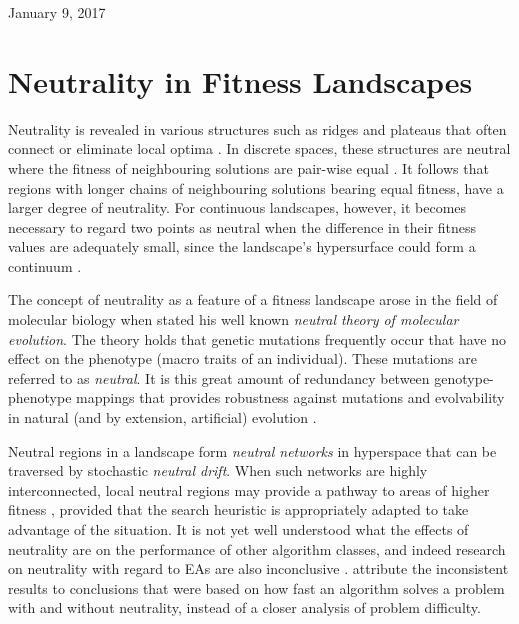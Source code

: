 \documentclass[conference]{IEEEtran}
\begin{document}
\hfill January 9, 2017

\section{Neutrality in Fitness Landscapes}
\label{backgroundNeutralityFL}
Neutrality is revealed in various structures such as ridges and plateaus that often connect or eliminate local optima \cite{owen2007adapting}. In discrete spaces, these structures are neutral where the fitness of neighbouring solutions are pair-wise equal \cite{reidys2001neutrality}. It follows that regions with longer chains of neighbouring solutions bearing equal fitness, have a larger degree of neutrality. For continuous landscapes, however, it becomes necessary to regard two points as neutral when the difference in their fitness values are adequately small, since the landscape's hypersurface could form a continuum \cite{izquierdo2004evolving}.

The concept of neutrality as a feature of a fitness landscape arose in the field of molecular biology when \citet{kimura1984neutral} stated his well known \textit{neutral theory of molecular evolution}. The theory holds that genetic mutations frequently occur that have no effect on the phenotype (macro traits of an individual). These mutations are referred to as \textit{neutral}. It is this great amount of redundancy between genotype-phenotype mappings that provides robustness against mutations \cite{wilke2001evolution,wagner2005robustness} and evolvability \cite{wagner2005robustness} in natural (and by extension, artificial) evolution \cite{huynen1996smoothness}. 

Neutral regions in a landscape form \textit{neutral networks} in hyperspace that can be traversed by stochastic \textit{neutral drift}\cite{katada2003measuring}. When such networks are highly interconnected, local neutral regions may provide a pathway to areas of higher fitness \cite{katada2003measuring}, provided that the search heuristic is appropriately adapted to take advantage of the situation. It is not yet well understood what the effects of neutrality are on the performance of other algorithm classes, and indeed research on neutrality with regard to EAs are also inconclusive \cite{galvan2011neutrality}. \citet{galvan2011neutrality} attribute the inconsistent results to conclusions that were based on how fast an algorithm solves a problem with and without neutrality, instead of a closer analysis of problem difficulty.
\end{document}
